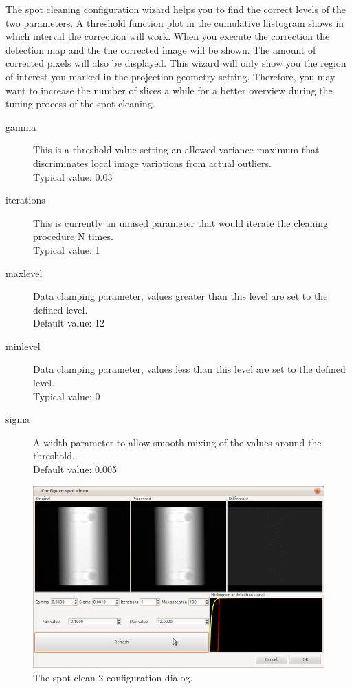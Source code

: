 \documentclass[a4paper]{scrreprt}
\begin{document}
The spot cleaning configuration wizard helps you to find the correct levels of
the two parameters. A threshold function plot in the cumulative histogram shows
in which interval the correction will work. When you execute the correction the
detection map and the the corrected image will be shown. The amount of corrected
pixels will also be displayed. This wizard will only show you the region of
interest you marked in the projection geometry setting. Therefore, you may want
to increase the number of slices a while for a better overview during the tuning
process of the spot cleaning.
\begin{description}
 \item[gamma] This is a threshold value setting an allowed variance maximum
that discriminates local image variations from actual outliers. \\
Typical value: 0.03
 \item[iterations] This is currently an unused parameter that would iterate
the cleaning procedure N times.\\
Typical value: 1
 \item[maxlevel] Data clamping parameter, values greater than this level are
set to the defined level.\\ Default value: 12
 \item[minlevel]Data clamping parameter, values less than this level are
set to the defined level.\\ Typical value: 0
 \item[sigma] A width parameter to allow smooth mixing of the values around
the threshold. \\ Default value: 0.005
\end{description}
\begin{figure}[ht!]
\centering
\includegraphics[scale=0.5]{figures/ConfSpotClean2.png}
\caption{The spot clean 2 configuration dialog.}
\end{figure}
\end{document}
